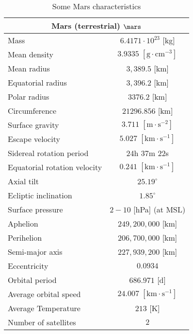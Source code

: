 	\begin{table}[H]
		\centering
		\begin{tabular}{|l|c|}
		\hline
		\multicolumn{2}{|c|}{\cellcolor[HTML]{9B9B9B}\textbf{Mars (terrestrial) $\mars$}} \\ \hline
		Mass & $6.4171\cdot 10^{23}$ {[}kg{]} \\ \hline		
		Mean density & $3.9335\;[\text{g}\cdot \text{cm}^{-3}]$ \\ \hline
		Mean radius & $3,389.5$ {[}km{]} \\ \hline
		Equatorial radius & $3,396.2$ {[}km{]} \\ \hline
		Polar radius & $3376.2$ {[}km{]} \\ \hline
		Circumference & $21296.856$ {[}km{]} \\ \hline
		Surface gravity & $3.711\; [\text{m}\cdot \text{s}^{-2}]$ \\ \hline
		Escape velocity & $5.027 \;[\text{km}\cdot\text{s}^{-1}]$ \\ \hline
		Sidereal rotation period & 24h 37m 22s \\ \hline
		Equatorial rotation velocity & $0.241\;[\text{km}\cdot\text{s}^{-1}]$ \\ \hline
		Axial tilt & $25.19^\circ$ \\ \hline
		Ecliptic inclination & $1.85^\circ$ \\ \hline
		Surface pressure & $2-10$ {[}hPa{]} (at MSL) \\ \hline
		Aphelion & $249,200,000$ {[}km{]} \\ \hline
		Perihelion & $206,700,000$ {[}km{]} \\ \hline
		Semi-major axis & $227,939,200$ {[}km{]} \\ \hline
		Eccentricity & $0.0934$ \\ \hline
		Orbital period & $686.971$ {[}d{]} \\ \hline
		Average orbital speed & $24.007\;[\text{km}\cdot\text{s}^{-1}]$ \\ \hline
		Average Temperature & $213$ {[}K{]} \\ \hline
		Number of satellites & $2$ \\ \hline
		\end{tabular}
		\caption{Some Mars characteristics}
	\end{table}
	
